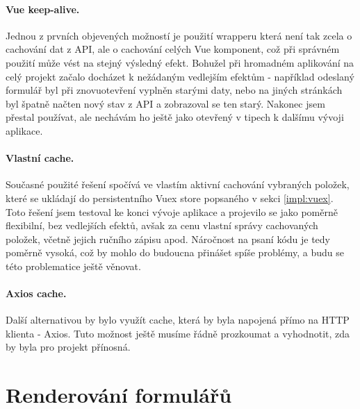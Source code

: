 \paragraph{Vue keep-alive.} Jednou z prvních objevených možností je použití wrapperu \cite{vue-keep-alive} která není tak zcela o cachování dat z API, ale o cachování celých Vue komponent, což při správném použití může vést na stejný výsledný efekt. Bohužel při hromadném aplikování na celý projekt začalo docházet k nežádaným vedlejším efektům - například odeslaný formulář byl při znovuotevření vyplněn starými daty, nebo na jiných stránkách byl špatně načten nový stav z API a zobrazoval se ten starý. Nakonec jsem  přestal používat, ale nechávám ho ještě jako otevřený v tipech k dalšímu vývoji aplikace.

\paragraph{Vlastní cache.} Současné použité řešení spočívá ve vlastím aktivní cachování vybraných položek, které se ukládají do persistentního Vuex store popsaného v sekci \ref{impl:vuex}. Toto řešení jsem testoval ke konci vývoje aplikace a projevilo se jako poměrně flexibilní, bez vedlejších efektů, avšak za cenu vlastní správy cachovaných položek, včetně jejich ručního zápisu apod. Náročnost na psaní kódu je tedy poměrně vysoká, což by mohlo do budoucna přinášet spíše problémy, a budu se této problematice ještě věnovat.

\paragraph{Axios cache.} Další alternativou by bylo využít cache, která by byla napojená přímo na HTTP klienta - Axios. Tuto možnost ještě musíme řádně prozkoumat a vyhodnotit, zda by byla pro projekt přínosná.


\section{Renderování formulářů} \label{implementation:formRender}

